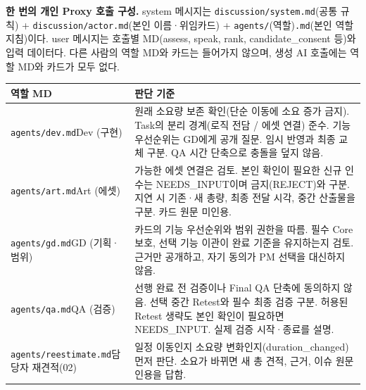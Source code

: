 \documentclass[11pt,a4paper]{article}
\begin{document}
\textbf{한 번의 개인 Proxy 호출 구성.} system 메시지는 \texttt{discussion/system.md}(공통 규칙) + \texttt{discussion/actor.md}(본인 이름·위임카드) + \texttt{agents/}(역할)\texttt{.md}(본인 역할 지침)이다. user 메시지는 호출별 MD(assess, speak, rank, candidate\_consent 등)와 입력 데이터다. 다른 사람의 역할 MD와 카드는 들어가지 않으며, 생성 AI 호출에는 역할 MD와 카드가 모두 없다.

\begin{tabularx}{\linewidth}{@{}p{36mm}Y@{}}\toprule
역할 MD & 판단 기준\\\midrule
\texttt{agents/dev.md}\newline Dev (구현) & 원래 소요량 보존 확인(단순 이동에 소요 증가 금지). Task의 분리 경계(로직 전담 / 에셋 연결) 준수. 기능 우선순위는 GD에게 공개 질문. 임시 반영과 최종 교체 구분. QA 시간 단축으로 충돌을 덮지 않음.\\
\texttt{agents/art.md}\newline Art (에셋) & 가능한 에셋 연결은 검토. 본인 확인이 필요한 신규 인수는 NEEDS\_INPUT이며 금지(REJECT)와 구분. 지연 시 기존·새 총량, 최종 전달 시각, 중간 산출물을 구분. 카드 원문 미인용.\\
\texttt{agents/gd.md}\newline GD (기획·범위) & 카드의 기능 우선순위와 범위 권한을 따름. 필수 Core 보호, 선택 기능 이관이 완료 기준을 유지하는지 검토. 근거만 공개하고, 자기 동의가 PM 선택을 대신하지 않음.\\
\texttt{agents/qa.md}\newline QA (검증) & 선행 완료 전 검증이나 Final QA 단축에 동의하지 않음. 선택 중간 Retest와 필수 최종 검증 구분. 허용된 Retest 생략도 본인 확인이 필요하면 NEEDS\_INPUT. 실제 검증 시작·종료를 설명.\\
\texttt{agents/reestimate.md}\newline 담당자 재견적(02) & 일정 이동인지 소요량 변화인지(duration\_changed) 먼저 판단. 소요가 바뀌면 새 총 견적, 근거, 이슈 원문 인용을 답함.\\\bottomrule
\end{tabularx}
\end{document}
